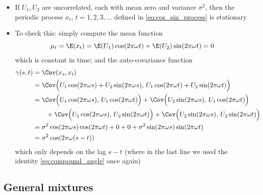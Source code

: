 \documentclass{article}
\begin{document}
\begin{itemize}
\item If $U_1,U_2$ are uncorrelated, each with mean zero and variance
  $\sigma^2$, then the periodic process $x_t$, $t = 1,2,3,\dots$ defined in
  \eqref{eq:cos_sin_process} is stationary 

\item To check this: simply compute the mean function
  \[
  \mu_t = \E(x_t) =\E(U_1) \cos(2\pi\omega t) + \E(U_2) \sin(2\pi\omega t) = 0 
  \]
  which is constant in time; and the auto-covariance function 
  \begin{align*}
  \gamma(s,t) &= \Cov(x_s, x_t) \\
  &= \Cov\Big( U_1 \cos(2\pi\omega s) + U_2 \sin(2\pi\omega s), \, 
    U_1 \cos(2\pi\omega t) + U_2 \sin(2\pi\omega t) \Big) \\
  &= \Cov\Big( U_1 \cos(2\pi\omega s), \, U_1 \cos(2\pi\omega t) \Big) +
    \Cov\Big( U_2 \sin(2\pi\omega s), \, U_1 \cos(2\pi\omega t) \Big) \\
  &\qquad + \Cov\Big( U_1 \cos(2\pi\omega s), \, U_2 \sin(2\pi\omega t) \Big) +  
     \Cov\Big( U_2 \sin(2\pi\omega s), \, U_2 \sin(2\pi\omega t) \Big) \\
  &=\sigma^2 \cos(2\pi\omega s) \cos(2\pi\omega t) + 0 + 0 + \sigma^2
    \sin(2\pi\omega s) \sin(2\pi\omega t) \\
  &= \sigma^2 \cos(2\pi\omega (s-t))
  \end{align*}
  which only depends on the lag $s-t$ (where in the last line we used the
  identity \eqref{eq:compound_angle} once again)
\end{itemize}

\subsection{General mixtures}
\end{document}
